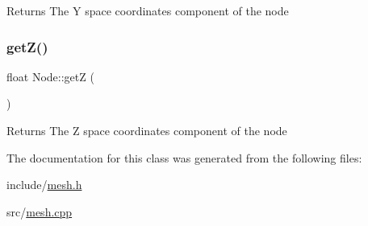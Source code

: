 \begin{DoxyReturn}{Returns}
The Y space coordinates component of the node 
\end{DoxyReturn}
\mbox{\label{classNode_ad275f03c5bf56c9ec572ff1da10bb34c}} 
\subsubsection{\texorpdfstring{get\+Z()}{getZ()}}
{\footnotesize\ttfamily float Node\+::getZ (\begin{DoxyParamCaption}{ }\end{DoxyParamCaption})}

\begin{DoxyReturn}{Returns}
The Z space coordinates component of the node 
\end{DoxyReturn}


The documentation for this class was generated from the following files\+:\begin{DoxyCompactItemize}
\item 
include/\hyperlink{mesh_8h}{mesh.\+h}\item 
src/\hyperlink{mesh_8cpp}{mesh.\+cpp}\end{DoxyCompactItemize}
